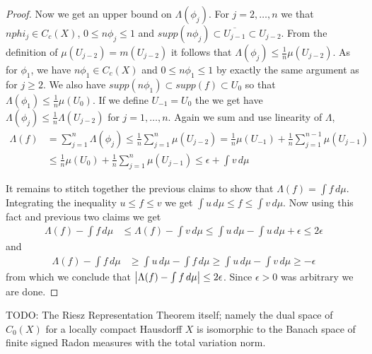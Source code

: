 \begin{proof}
Now we get an upper bound on $\Lambda(\phi_j)$.   For $j=2, \dotsc, n$ we that
$n phi_j \in C_c(X)$, $0 \leq n \phi_j \leq 1$ and $supp(n \phi_j)
\subset \overline{U_{j-1}} \subset U_{j-2}$.  From the definition of
$\mu(U_{j-2}) =m(U_{j-2})$ it follows that $\Lambda(\phi_j) \leq
\frac{1}{n} \mu(U_{j-2})$.  As for $\phi_1$, we have
$n \phi_1 \in C_c(X)$ and $0 \leq n\phi_1 \leq 1$ by exactly the same
argument as for $j \geq 2$.  We also have $supp(n \phi_1) \subset
supp(f) \subset U_0$ so that $\Lambda(\phi_1) \leq \frac{1}{n}
\mu(U_0)$.  If we define $U_{-1} = U_0$ the we get
have $\Lambda(\phi_j) \leq \frac{1}{n} \Lambda(U_{j-2})$ for $j=1,
\dotsc, n$.  Again we sum and use linearity of $\Lambda$,
\begin{align*}
\Lambda(f) &= \sum_{j=1}^n \Lambda(\phi_j) \leq \frac{1}{n}
\sum_{j=1}^n \mu(U_{j-2}) = \frac{1}{n} \mu(U_{-1}) +  \frac{1}{n}
\sum_{j=1}^{n-1} \mu(U_{j-1}) \\
&\leq \frac{1}{n} \mu(U_{0}) +  \frac{1}{n}
\sum_{j=1}^{n} \mu(U_{j-1}) \leq \epsilon + \int v \, d\mu
\end{align*}

It remains to stitch together the previous claims to
show that $\Lambda(f) = \int f \, d\mu$.  Integrating the inequality
$u \leq f \leq v$ we get $\int u \, d\mu \leq f \leq \int v \, d\mu$.
Now using this fact and previous two claims we get
\begin{align*}
\Lambda(f) - \int f \, d\mu &\leq \Lambda(f) - \int v \, d\mu \leq
\int u \, d\mu  - \int u \, d\mu + \epsilon \leq 2 \epsilon
\end{align*}
and
\begin{align*}
\Lambda(f) - \int f \, d\mu &\geq \int u \, d\mu - \int f \, d\mu \geq
\int u \, d\mu - \int v \, d\mu \geq -\epsilon
\end{align*}
from which we conclude that $\left \vert \Lambda(f) - \int f \, d\mu \right \vert \leq
2\epsilon$.  Since $\epsilon > 0$ was arbitrary we are done.
\end{proof}

TODO: The Riesz Representation Theorem itself; namely the dual space of $C_0(X)$ for a locally compact Hausdorff $X$ is 
isomorphic to the Banach space of finite signed Radon measures with the total variation norm.

